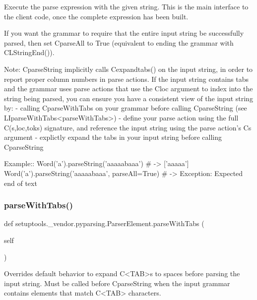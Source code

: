 \begin{DoxyVerb}Execute the parse expression with the given string.
This is the main interface to the client code, once the complete
expression has been built.

If you want the grammar to require that the entire input string be
successfully parsed, then set C{parseAll} to True (equivalent to ending
the grammar with C{L{StringEnd()}}).

Note: C{parseString} implicitly calls C{expandtabs()} on the input string,
in order to report proper column numbers in parse actions.
If the input string contains tabs and
the grammar uses parse actions that use the C{loc} argument to index into the
string being parsed, you can ensure you have a consistent view of the input
string by:
 - calling C{parseWithTabs} on your grammar before calling C{parseString}
   (see L{I{parseWithTabs}<parseWithTabs>})
 - define your parse action using the full C{(s,loc,toks)} signature, and
   reference the input string using the parse action's C{s} argument
 - explictly expand the tabs in your input string before calling
   C{parseString}

Example::
    Word('a').parseString('aaaaabaaa')  # -> ['aaaaa']
    Word('a').parseString('aaaaabaaa', parseAll=True)  # -> Exception: Expected end of text
\end{DoxyVerb}
 \mbox{\label{classsetuptools_1_1__vendor_1_1pyparsing_1_1_parser_element_a6a477b4b208bb35b986767e437994633}} 
\subsubsection{\texorpdfstring{parse\+With\+Tabs()}{parseWithTabs()}}
{\footnotesize\ttfamily def setuptools.\+\_\+vendor.\+pyparsing.\+Parser\+Element.\+parse\+With\+Tabs (\begin{DoxyParamCaption}\item[{}]{self }\end{DoxyParamCaption})}

\begin{DoxyVerb}Overrides default behavior to expand C{<TAB>}s to spaces before parsing the input string.
Must be called before C{parseString} when the input grammar contains elements that
match C{<TAB>} characters.
\end{DoxyVerb}
 \mbox{\label{classsetuptools_1_1__vendor_1_1pyparsing_1_1_parser_element_ae01ef499653e57fa7cd9aa2d3fe5cd4c}} 
